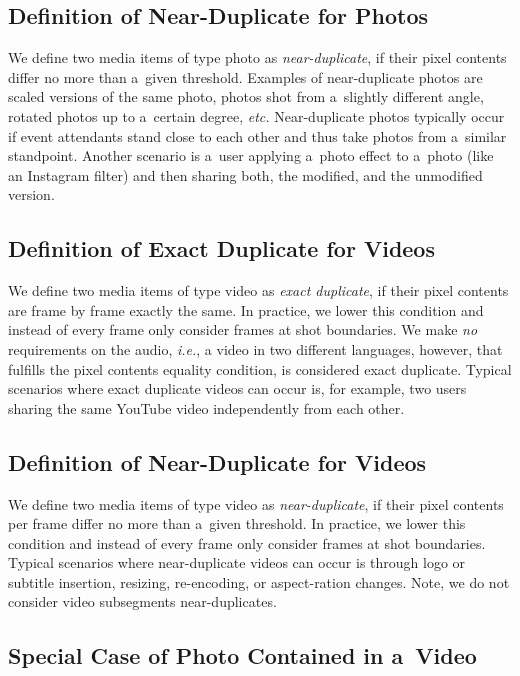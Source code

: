 \subsection{Definition of Near-Duplicate for Photos}

We define two media items of type photo as \emph{near-duplicate},
if their pixel contents differ no more than a~given threshold.
Examples of near-duplicate photos are scaled versions
of the same photo, photos shot from a~slightly different angle,
rotated photos up to a~certain degree, \emph{etc.}
Near-duplicate photos typically occur if event attendants
stand close to each other and thus take photos
from a~similar standpoint.
Another scenario is a~user applying a~photo effect to a~photo
(like an Instagram filter) and then sharing both, the modified,
and the unmodified version.

\subsection{Definition of Exact Duplicate for Videos}

We define two media items of type video as \emph{exact duplicate},
if their pixel contents are frame by frame exactly the same.
In practice, we lower this condition and instead of every frame
only consider frames at shot boundaries.
We make \emph{no} requirements on the audio, \emph{i.e.},
a video in two different languages, however, that fulfills the 
pixel contents equality condition, is considered exact duplicate.
Typical scenarios where exact duplicate videos can occur is,
for example, two users sharing the same YouTube video
independently from each other.

\subsection{Definition of Near-Duplicate for Videos}

We define two media items of type video as \emph{near-duplicate},
if their pixel contents per frame differ no more
than a~given threshold.
In practice, we lower this condition and instead of every frame
only consider frames at shot boundaries.
Typical scenarios where near-duplicate videos can occur is through
logo or subtitle insertion, resizing, re-encoding,
or aspect-ration changes.
Note, we do not consider video subsegments near-duplicates.

\subsection{Special Case of Photo Contained in a~Video}

